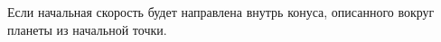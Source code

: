 Если начальная скорость будет направлена внутрь конуса, описанного вокруг планеты из начальной точки.